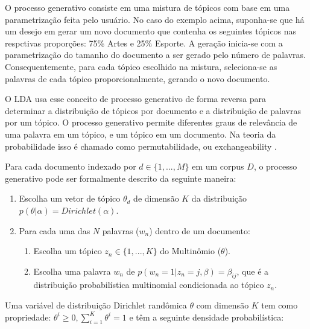 \documentclass[12pt,a4paper]{article}
\begin{document}
  O processo generativo consiste em uma mistura de tópicos com base em uma parametrização feita pelo usuário. No caso do exemplo acima, suponha-se que há um desejo em gerar um novo documento que contenha os seguintes tópicos nas respctivas proporções: 75\% Artes e 25\% Esporte. A geração inicia-se com a parametrização do tamanho do documento a ser gerado pelo número de palavras. Consequentemente, para cada tópico escolhido na mistura, seleciona-se as palavras de cada tópico proporcionalmente, gerando o novo documento.
  
   O LDA usa esse conceito de processo generativo de forma reversa para determinar a distribuição de tópicos por documento e a distribuição de palavras por um tópico. 
   O processo generativo permite diferentes graus de relevância de uma palavra em um tópico, e um tópico em um documento. Na teoria da probabilidade isso é chamado como permutabilidade,
   ou exchangeability \cite{aldous1985exchangeability}. 
   
   Para cada documento indexado por $d \in \{1,. . . , M\}$ em um corpus $D$, o processo generativo pode ser formalmente descrito da seguinte maneira:
  
  
  \begin{enumerate}
    \item Escolha um vetor de tópico $\theta _d$ de dimensão $K$ da distribuição $p(\theta|\alpha)=Dirichlet(\alpha)$.
    \item Para cada uma das $N$ palavras ($w_n$) dentro de um documento:
    \begin{enumerate}
      \item Escolha um tópico \(z_n \in \{1,. . . , K\}\) do Multinômio ($\theta$).
      \item Escolha uma palavra $w_n$ de \(p(w_n=1| z_n=j,\beta)=\beta _{ij}\), que é a distribuição probabilística multinomial condicionada ao tópico $z_n$.
    \end{enumerate}
  \end{enumerate}
  
  
  Uma variável de distribuição Dirichlet randômica $\theta$ com dimensão $K$ tem como propriedade: $\theta ^i \geq 0, \displaystyle\sum_{i=1}^{K} \theta ^i = 1$ e têm a seguinte densidade probabilística:
  
\end{document}
